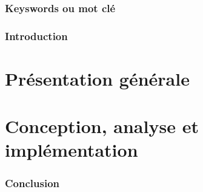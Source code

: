 \documentclass[12pt,a4paper]{report}
\begin{document}
\pagebreak


\begin{abstract}
	\lipsum[2]
\end{abstract}
\begin{abstract}
	\lipsum[2]
\end{abstract}


\section*{Keyswords ou mot clé}


\newpage
\listoftables
\newpage
\listoffigures

\newpage 	
{}		
\pagestyle{fancy}


\newpage
\section*{Introduction}
\newpage

\part{Présentation générale}







\part{Conception, analyse  et implémentation}



%



\newpage
{}
\section*{Conclusion}


\pagebreak


 
 
\end{document}
